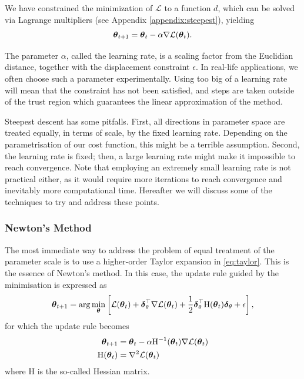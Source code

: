 We have constrained the minimization of $\mathcal{L}$  to a function $d$, which can be solved via Lagrange multipliers (see Appendix \ref{appendix:steepest}), yielding
\begin{equation}
\boldsymbol{\theta}_{t+1} = \boldsymbol{\theta}_t - \alpha \nabla \mathcal{L}(\boldsymbol{\theta}_t)    .
\label{eq:gradient_rule}
\end{equation}

The parameter $\alpha$, called the learning rate, is a scaling factor from the Euclidian distance, together with the displacement constraint $\epsilon$. In real-life applications, we often choose such a parameter experimentally. Using too big of a learning rate will mean that the constraint has not been satisfied, and steps are taken outside of the trust region which guarantees the linear approximation of the method.

Steepest descent has some pitfalls. First, all directions in parameter space are treated equally, in terms of scale, by the fixed learning rate. Depending on the parametrisation of our cost function, this might be a terrible assumption. Second, the learning rate is fixed; then, a large learning rate might make it impossible to reach convergence. Note that employing an extremely small learning rate is not practical either, as it would require more iterations to reach convergence and inevitably more computational time. Hereafter we will discuss some of the techniques to try and address these points. 

\subsubsection{Newton's Method}

The most immediate way to address the problem of equal treatment of the parameter scale is to use a higher-order Taylor expansion in \eqref{eq:taylor}. This is the essence of Newton's method. In this case, the update rule guided by the minimisation is expressed as 
\begin{equation}
\boldsymbol{\theta}_{t+1} = \arg \min_{\boldsymbol{\theta}} \left[\mathcal{L}(\boldsymbol{\theta}_t) +  \boldsymbol{\delta}_{\theta}^\top \nabla \mathcal{L}(\boldsymbol{\theta}_t) + \frac{1}{2}  \boldsymbol{\delta}_{\theta}^\top \text{H}(\boldsymbol{\theta}_t)  \boldsymbol{\delta}_{\theta} + \epsilon \right],
\label{eq:newtons_minimisation}
\end{equation}
for which the update rule becomes
\begin{align}
\boldsymbol{\theta}_{t+1} &= \boldsymbol{\theta}_t - \alpha \text{H}^{-1}(\boldsymbol{\theta}_t)\nabla \mathcal{L}(\boldsymbol{\theta}_t)\\  
\text{H}(\boldsymbol{\theta}_t)&=\nabla^2 \mathcal{L}(\boldsymbol{\theta}_t)
\label{eq:newtons_method}
\end{align}
where $\text{H}$ is the so-called Hessian matrix.

